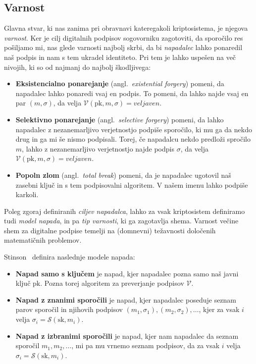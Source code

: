 \documentclass[isrm2, tisk]{fmfdelo}
\begin{document}
\subsection{Varnost}
Glavna stvar, ki nas zanima pri obravnavi kateregakoli kriptosistema, je njegova \textit{varnost}. 
Ker je cilj digitalnih podpisov sogovorniku zagotoviti, da sporočilo res pošiljamo mi, nas glede 
varnosti najbolj skrbi, da bi \textit{napadalec} lahko ponaredil naš podpis in nam s tem ukradel 
identiteto. Pri tem je lahko uspešen na več nivojih, ki so od najmanj do najbolj škodljivega:

\begin{itemize}
    \item \textbf{Eksistencialno ponarejanje} (angl.\ \textit{existential forgery}) pomeni, da napadalec 
        lahko ponaredi vsaj en podpis. To pomeni, da lahko najde vsaj en par $(m, \sigma)$, da 
        velja $\mathcal{V}(\text{pk}, m, \sigma) = veljaven$.
    \item \textbf{Selektivno ponarejanje} (angl.\ \textit{selective forgery}) pomeni, da lahko napadalec 
        z nezanemarljivo verjetnostjo podpiše sporočilo, ki mu ga da nekdo drug in ga mi še nismo 
        podpisali. Torej, če napadalcu nekdo predloži spročilo $m$, lahko z nezanemarljivo verjetnostjo 
        najde podpis $\sigma$, da velja $\mathcal{V}(\text{pk}, m, \sigma) = veljaven$.
    \item \textbf{Popoln zlom} (angl.\ \textit{total break}) pomeni, da je napadalec ugotovil naš 
        zasebni ključ in s tem podpisovalni algoritem. V našem imenu lahko podpiše karkoli.
\end{itemize}

Poleg zgoraj definiranih \textit{ciljev napadalca}, lahko za vsak kriptosistem definiramo tudi
\textit{model napada}, in pa \textit{tip varnosti}, ki ga zagotavlja shema. Varnost večine shem za 
digitalne podpise temelji na (domnevni) težavnosti določenih matematičnih problemov.

Stinson~\cite{stinson2023crypto} definira naslednje modele napada:
\begin{itemize}
    \item \textbf{Napad samo s ključem} je napad, kjer napadalec pozna samo naš javni ključ $\text{pk}$. 
        Pozna torej algoritem za preverjanje podpisov $\mathcal{V}$.
    \item \textbf{Napad z znanimi sporočili} je napad, kjer napadalec poseduje seznam parov sporočil 
        in njihovih podpisov $(m_1, \sigma_1), (m_2, \sigma_2), \dots$, kjer za vsak $i$ velja 
        $\sigma_i = \mathcal{S}(\text{sk}, m_i)$.
    \item \textbf{Napad z izbranimi sporočili} je napad, kjer nam napadalec da seznam sporočil $m_1,
        m_2, \dots$, mi pa mu vrnemo seznam podpisov, da za vsak $i$ velja $\sigma_i = \mathcal{S}(\text{sk}, 
        m_i)$.
\end{itemize}
\end{document}
